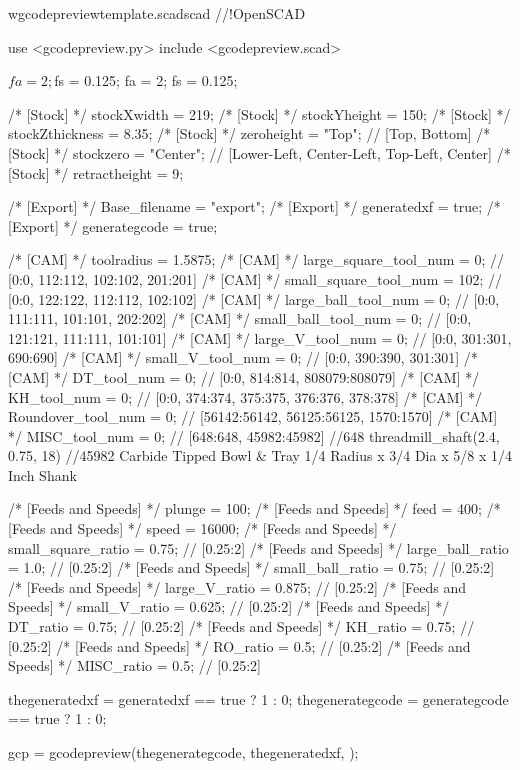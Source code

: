 \documentclass{ltxdoc}
\begin{document}
\lstset{firstnumber=1}%
\begin{writecode}{w}{gcodepreviewtemplate.scad}{scad}
//!OpenSCAD

use <gcodepreview.py>
include <gcodepreview.scad>

$fa = 2;
$fs = 0.125;
fa = 2;
fs = 0.125;

/* [Stock] */
stockXwidth = 219;
/* [Stock] */
stockYheight = 150;
/* [Stock] */
stockZthickness = 8.35;
/* [Stock] */
zeroheight = "Top"; // [Top, Bottom]
/* [Stock] */
stockzero = "Center"; // [Lower-Left, Center-Left, Top-Left, Center]
/* [Stock] */
retractheight = 9;

/* [Export] */
Base_filename = "export"; 
/* [Export] */
generatedxf = true; 
/* [Export] */
generategcode = true; 

/* [CAM] */
toolradius = 1.5875;
/* [CAM] */
large_square_tool_num = 0; // [0:0, 112:112, 102:102, 201:201]
/* [CAM] */
small_square_tool_num = 102; // [0:0, 122:122, 112:112, 102:102]
/* [CAM] */
large_ball_tool_num = 0; // [0:0, 111:111, 101:101, 202:202]
/* [CAM] */
small_ball_tool_num = 0; // [0:0, 121:121, 111:111, 101:101]
/* [CAM] */
large_V_tool_num = 0; // [0:0, 301:301, 690:690]
/* [CAM] */
small_V_tool_num = 0; // [0:0, 390:390, 301:301]
/* [CAM] */
DT_tool_num = 0; // [0:0, 814:814, 808079:808079]
/* [CAM] */
KH_tool_num = 0; // [0:0, 374:374, 375:375, 376:376, 378:378]
/* [CAM] */
Roundover_tool_num = 0; // [56142:56142, 56125:56125, 1570:1570]
/* [CAM] */
MISC_tool_num = 0; // [648:648, 45982:45982]
//648 threadmill_shaft(2.4, 0.75, 18)
//45982 Carbide Tipped Bowl & Tray 1/4 Radius x 3/4 Dia x 5/8 x 1/4 Inch Shank

/* [Feeds and Speeds] */
plunge = 100;
/* [Feeds and Speeds] */
feed = 400;
/* [Feeds and Speeds] */
speed = 16000;
/* [Feeds and Speeds] */
small_square_ratio = 0.75; // [0.25:2]
/* [Feeds and Speeds] */
large_ball_ratio = 1.0; // [0.25:2]
/* [Feeds and Speeds] */
small_ball_ratio = 0.75; // [0.25:2]
/* [Feeds and Speeds] */
large_V_ratio = 0.875; // [0.25:2]
/* [Feeds and Speeds] */
small_V_ratio = 0.625; // [0.25:2]
/* [Feeds and Speeds] */
DT_ratio = 0.75; // [0.25:2]
/* [Feeds and Speeds] */
KH_ratio = 0.75; // [0.25:2]
/* [Feeds and Speeds] */
RO_ratio = 0.5; // [0.25:2]
/* [Feeds and Speeds] */
MISC_ratio = 0.5; // [0.25:2]

thegeneratedxf = generatedxf == true ? 1 : 0;
thegenerategcode = generategcode == true ? 1 : 0;

gcp = gcodepreview(thegenerategcode, 
                   thegeneratedxf, 
                   );


\end{writecode}
\end{document}
